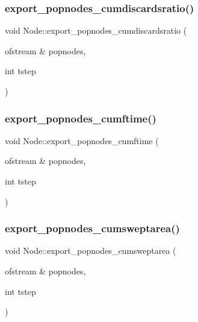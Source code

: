\mbox{\label{class_node_a23d913f96c8b237eb9b0273fa8707800}} 
\subsubsection{\texorpdfstring{export\_popnodes\_cumdiscardsratio()}{export\_popnodes\_cumdiscardsratio()}}
{\footnotesize\ttfamily void Node\+::export\+\_\+popnodes\+\_\+cumdiscardsratio (\begin{DoxyParamCaption}\item[{ofstream \&}]{popnodes,  }\item[{int}]{tstep }\end{DoxyParamCaption})}

\mbox{\label{class_node_ad0c96ba0aff8cd3b1caad58c43c64273}} 
\subsubsection{\texorpdfstring{export\_popnodes\_cumftime()}{export\_popnodes\_cumftime()}}
{\footnotesize\ttfamily void Node\+::export\+\_\+popnodes\+\_\+cumftime (\begin{DoxyParamCaption}\item[{ofstream \&}]{popnodes,  }\item[{int}]{tstep }\end{DoxyParamCaption})}

\mbox{\label{class_node_a8e870904fc79d763ee027b5c77a85c00}} 
\subsubsection{\texorpdfstring{export\_popnodes\_cumsweptarea()}{export\_popnodes\_cumsweptarea()}}
{\footnotesize\ttfamily void Node\+::export\+\_\+popnodes\+\_\+cumsweptarea (\begin{DoxyParamCaption}\item[{ofstream \&}]{popnodes,  }\item[{int}]{tstep }\end{DoxyParamCaption})}

